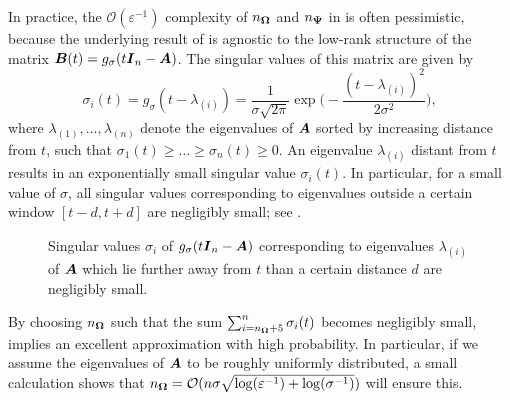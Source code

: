 In practice, the $\mathcal{O}(\varepsilon^{-1})$ complexity of $n_{\boldsymbol{\Omega}}$ and $n_{\boldsymbol{\Psi}}$ in  is often pessimistic, because  the underlying result of  is agnostic to the low-rank structure of the matrix $\boldsymbol{B}(t) = g_{\sigma}(t\boldsymbol{I}_n - \boldsymbol{A})$. The singular values of this matrix are given by
\begin{equation*}
    \sigma_i(t) = g_{\sigma}(t - \lambda_{(i)}) = \frac{1}{\sigma\sqrt{2 \pi}} \exp\Big( -\frac{(t - \lambda_{(i)})^2}{2 \sigma^2} \Big),  
    \label{equ:gaussian-kernel-eigenvalues}
\end{equation*}
where $\lambda_{(1)}, \dots, \lambda_{(n)}$ denote the eigenvalues of $\boldsymbol{A}$ sorted by increasing distance from $t$, such that $\sigma_1(t) \geq \dots \geq \sigma_n(t) \ge 0$. An eigenvalue $\lambda_{(i)}$ distant from $t$ results in an exponentially small singular value $\sigma_i(t)$. In particular, for a small value of $\sigma$, all singular values corresponding to eigenvalues outside a certain window $[t - d, t + d]$ are negligibly small; see .
\begin{figure}[ht]
    \centering
    
    \caption{Singular values $\sigma_i$ of $g_{\sigma}(t\boldsymbol{I}_n - \boldsymbol{A})$ corresponding to eigenvalues $\lambda_{(i)}$ of $\boldsymbol{A}$ which lie further away from $t$ than a certain distance $d$ are negligibly small.}
    \label{fig:numerical-rank}
\end{figure}
By choosing $n_{\boldsymbol{\Omega}}$ such that the sum $\sum_{i=n_{\boldsymbol{\Omega}}+5}^{n} \sigma_i(t)$ becomes negligibly small,   implies an excellent approximation with high probability. In particular, if we assume the eigenvalues of $\boldsymbol{A}$ to be roughly uniformly distributed, a small calculation shows that $n_{\boldsymbol{\Omega}} = \mathcal{O}(n \sigma \sqrt{\log(\varepsilon^{-1}) + \log(\sigma^{-1})})$ will ensure this.

